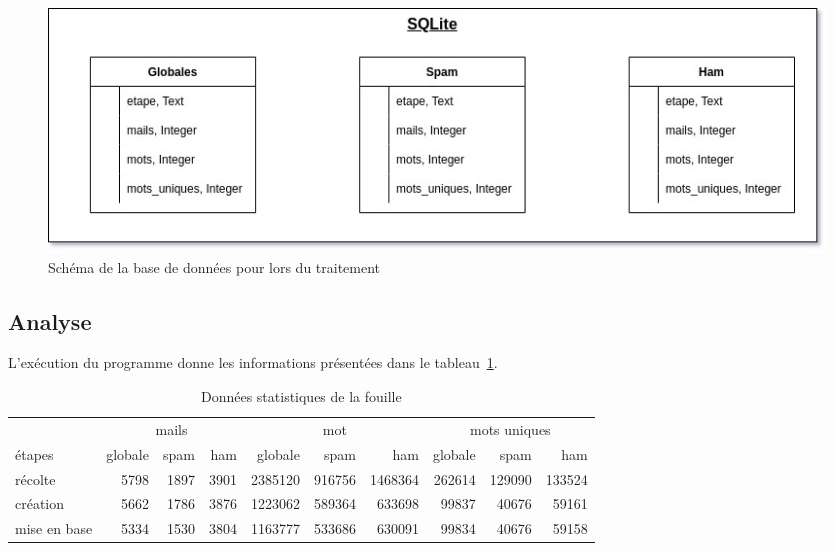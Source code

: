        \begin{figure}[H]
            \includegraphics[width=\linewidth]{img/Schemasqlite}
            \caption{Schéma de la base de données pour lors du traitement}
            \label{fig:sqlite_schema}
        \end{figure}

\subsection*{Analyse}
    L'exécution du programme donne les informations présentées dans le tableau~\ref{tab:fouillestats}.
    \begin{table}[H]
        \centering
        \begin{tabular}{l|rrr|rrr|rrr}
            & \multicolumn{3}{c}{mails} & \multicolumn{3}{c}{mot} & \multicolumn{3}{c}{mots uniques}\\
            étapes & globale & spam & ham & globale & spam & ham & globale & spam & ham\\
            \hline
            récolte & 5798 & 1897 & 3901 & 2385120 & 916756 & 1468364 & 262614 & 129090 & 133524\\
            création & 5662 & 1786 & 3876 & 1223062 & 589364 & 633698 & 99837 & 40676 & 59161\\
            mise en base & 5334 & 1530 & 3804 & 1163777 & 533686 & 630091 & 99834 & 40676 & 59158\\
        \end{tabular}
        \caption{Données statistiques de la fouille}
        \label{tab:fouillestats}
    \end{table}
    
